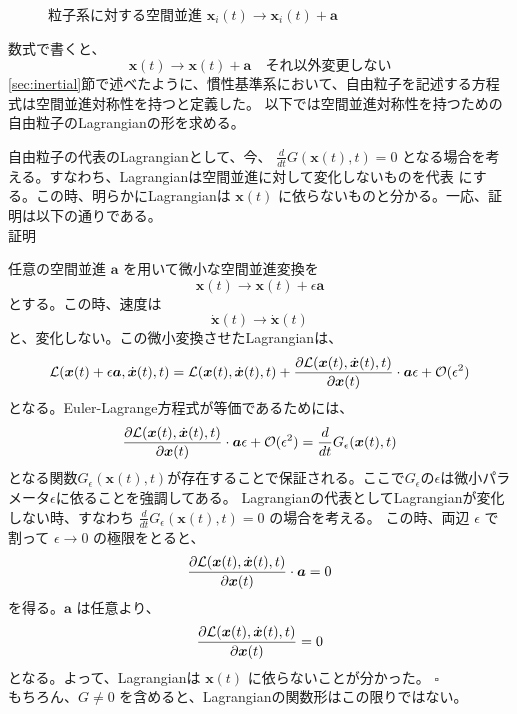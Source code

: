 \documentclass[a4paper,11pt]{ltjsarticle}
\newcommand{\La}{\mathcal{L}}
\begin{document}
\begin{figure}[ht]

\caption{粒子系に対する空間並進
$\bm{x}_i(t)\rightarrow \bm{x}_i(t)+\bm a$}
\label{fig:spatial-translation}
\end{figure}

数式で書くと、
\[
\bm{x}(t)\rightarrow \bm{x}(t)+\bm{a} \quad それ以外変更しない
\]
\ref{sec:inertial}節で述べたように、慣性基準系において、自由粒子を記述する方程式は空間並進対称性を持つと定義した。
以下では空間並進対称性を持つための自由粒子のLagrangianの形を求める。

自由粒子の代表のLagrangianとして、今、 $\frac{d}{dt}G(\bm{x}(t),t)=0$ となる場合を考える。すなわち、Lagrangianは空間並進に対して変化しないものを代表
にする。この時、明らかにLagrangianは $\bm{x}(t)$ に依らないものと分かる。一応、証明は以下の通りである。
\\$\textbf{証明}$

任意の空間並進 $\bm{a}$ を用いて微小な空間並進変換を
\[
\bm{x}(t) \rightarrow \bm{x}(t)+\epsilon\bm{a}
\]
とする。この時、速度は
\[
\dot{\bm{x}}(t) \rightarrow \dot{\bm{x}}(t)
\]
と、変化しない。この微小変換させたLagrangianは、
\[
\La(\bm{x}(t)+\epsilon\bm{a},\dot{\bm{x}}(t),t)=\La(\bm{x}(t),\dot{\bm{x}}(t),t)+\pdv{\La(\bm{x}(t),\dot{\bm{x}}(t),t)}{\bm{x}(t)}\cdot\bm{a}\epsilon+\mathcal{O}(\epsilon^2)
\]
となる。Euler-Lagrange方程式が等価であるためには、
\[
\pdv{\La(\bm{x}(t),\dot{\bm{x}}(t),t)}{\bm{x}(t)}\cdot\bm{a}\epsilon+\mathcal{O}(\epsilon^2)
=\frac{d}{dt}G_\epsilon(\bm{x}(t),t)
\]
となる関数$G_\epsilon(\bm{x}(t),t)$が存在することで保証される。ここで$G_\epsilon$の$\epsilon$は微小パラメータ$\epsilon$に依ることを強調してある。
Lagrangianの代表としてLagrangianが変化しない時、すなわち $\frac{d}{dt}G_\epsilon(\bm{x}(t),t)=0$ の場合を考える。
この時、両辺 $\epsilon$ で割って $\epsilon \rightarrow 0$ の極限をとると、
\[
\pdv{\La(\bm{x}(t),\dot{\bm{x}}(t),t)}{\bm{x}(t)}\cdot\bm{a}=0
\]
を得る。$\bm{a}$ は任意より、
\[
\pdv{\La(\bm{x}(t),\dot{\bm{x}}(t),t)}{\bm{x}(t)}=0
\]
となる。よって、Lagrangianは $\bm{x}(t)$ に依らないことが分かった。 $\square$
\\もちろん、$G\ne0$ を含めると、Lagrangianの関数形はこの限りではない。
\end{document}
